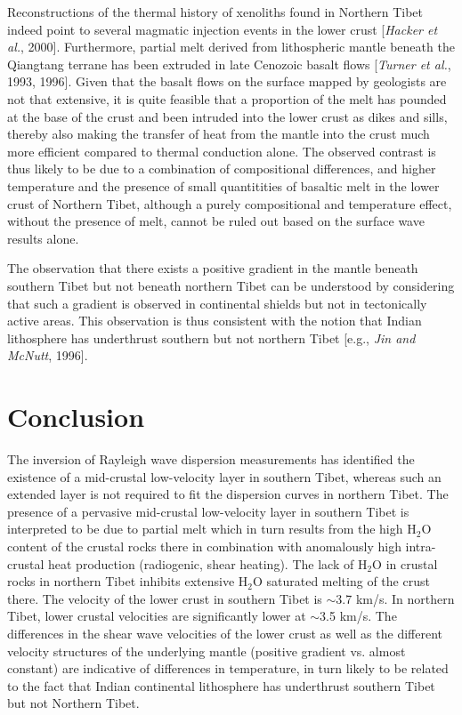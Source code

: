 \documentclass[12pt]{article}
\begin{document}
Reconstructions of the thermal history of xenoliths found in Northern
Tibet indeed point to several magmatic injection events in the lower
crust [{\it Hacker et al.}, 2000].
Furthermore, partial melt derived from lithospheric mantle beneath the Qiangtang terrane has been extruded
in late Cenozoic basalt flows [{\it Turner et al.}, 1993, 1996].  Given that the basalt flows on the
surface mapped by geologists are not that extensive, it is quite feasible that a proportion of the
melt has pounded at the base of the crust and been intruded into the lower crust as dikes and sills,
thereby also making the transfer of heat from the mantle into the crust much more efficient compared to thermal
conduction alone.
The observed contrast is thus likely to be due to
a combination of compositional differences, and higher temperature and the presence of small quantitities
of basaltic melt in the lower crust of Northern Tibet, although a
purely compositional and temperature effect, without the presence of
melt, cannot be ruled out based on the surface wave results alone.

 The observation that there exists a positive gradient in the mantle
beneath southern Tibet but not beneath northern Tibet can be
understood by considering that such a gradient is observed in
continental shields but not in tectonically active areas.  This
observation is thus consistent with the notion that Indian lithosphere
has underthrust southern but not northern Tibet [e.g., {\it Jin and
McNutt}, 1996].

\section{Conclusion}

The inversion of Rayleigh wave dispersion measurements has identified the existence of a mid-crustal
low-velocity layer in southern Tibet, whereas such an extended layer is not required to fit the dispersion
curves in northern Tibet.  The presence of a pervasive mid-crustal low-velocity layer in southern Tibet is
interpreted to be due to partial melt which in turn results from the high H$_2$O content of the crustal rocks there in combination with
anomalously high intra-crustal heat production (radiogenic, shear heating).   The lack of H$_2$O in crustal
rocks in northern Tibet inhibits extensive H$_2$O saturated melting of the crust there.  The velocity of the
lower crust in southern Tibet is $\sim$3.7 km/s.  In northern Tibet, lower crustal velocities are significantly
lower at $\sim$3.5 km/s.  The differences in the shear wave velocities of the lower crust as well as the different velocity structures  of the underlying mantle (positive gradient vs. almost constant) are
indicative of differences in temperature, in turn likely to be related to the fact that Indian continental lithosphere has underthrust southern Tibet but not Northern Tibet.
\end{document}
